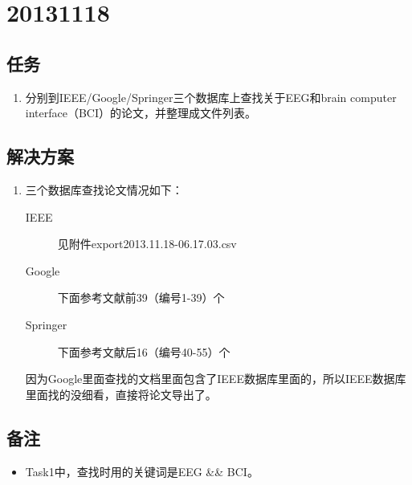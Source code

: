 \section{20131118}
\subsection{任务}
\begin{enumerate}
\item 分别到IEEE/Google/Springer三个数据库上查找关于EEG和brain computer interface（BCI）的论文，并整理成文件列表。
\end{enumerate}


\subsection{解决方案}
\begin{enumerate}
\item 三个数据库查找论文情况如下：
\begin{description}
\item[IEEE] 见附件export2013.11.18-06.17.03.csv
\item[Google] 下面参考文献前39（编号1-39）个
\item[Springer] 下面参考文献后16（编号40-55）个
\end{description}
因为Google里面查找的文档里面包含了IEEE数据库里面的，所以IEEE数据库里面找的没细看，直接将论文导出了。
\end{enumerate}



\subsection{备注}
\begin{itemize}
\item Task1中，查找时用的关键词是EEG \&\& BCI。
\end{itemize}

\nocite{*}



%
